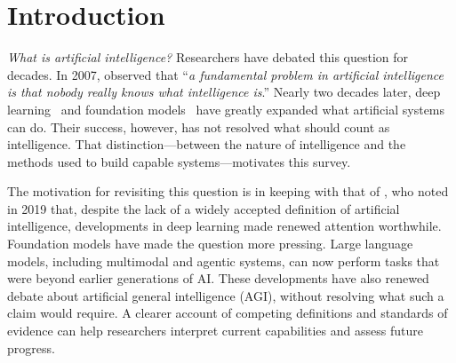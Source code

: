 \documentclass[acmsmall,screen,review,anonymous]{acmart}
\begin{document}




\maketitle

\section{Introduction}
\label{sec:intro}


\textit{What is artificial intelligence?}
%
Researchers have debated this question for decades.
%
In 2007, \citet{legghutter2007} observed that ``\textit{a fundamental problem in artificial intelligence is that nobody really knows what intelligence is}.''
%
Nearly two decades later, deep learning~\cite{Goodfellow-et-al-2016} and foundation models~\cite{bommasani2021opportunities,chatgpt} have greatly expanded what artificial systems can do.
%
Their success, however, has not resolved what should count as intelligence.
%
That distinction---between the nature of intelligence and the methods used to build capable systems---motivates this survey.

The motivation for revisiting this question is in keeping with that of \citet{wang2019define}, who noted in 2019 that, despite the lack of a widely accepted definition of artificial intelligence, developments in deep learning made renewed attention worthwhile.
%
Foundation models have made the question more pressing.
%
Large language models, including multimodal and agentic systems, can now perform tasks that were beyond earlier generations of AI.
%
These developments have also renewed debate about artificial general intelligence (AGI), without resolving what such a claim would require.
%
A clearer account of competing definitions and standards of evidence can help researchers interpret current capabilities and assess future progress.
\end{document}
